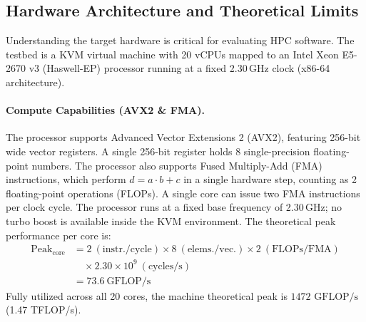 \documentclass[11pt,a4paper]{article}
\begin{document}
\subsection*{Hardware Architecture and Theoretical Limits}
Understanding the target hardware is critical for evaluating HPC software. The testbed is a KVM virtual machine with 20 vCPUs mapped to an Intel Xeon E5-2670 v3 (Haswell-EP) processor running at a fixed 2.30\,GHz clock (x86-64 architecture).

\paragraph{Compute Capabilities (AVX2 \& FMA).}
The processor supports Advanced Vector Extensions 2 (AVX2), featuring 256-bit wide vector registers. A single 256-bit register holds 8 single-precision floating-point numbers. The processor also supports Fused Multiply-Add (FMA) instructions, which perform $d = a \cdot b + c$ in a single hardware step, counting as 2 floating-point operations (FLOPs). 
A single core can issue two FMA instructions per clock cycle. The processor runs at a fixed base frequency of 2.30\,GHz; no turbo boost is available inside the KVM environment. The theoretical peak performance per core is:
\begin{equation}
\begin{split}
\text{Peak}_{\text{core}} &= 2\ (\text{instr./cycle}) \times 8\ (\text{elems./vec.}) \times 2\ (\text{FLOPs/FMA})\\
&\quad\times 2.30\times10^{9}\ (\text{cycles/s})\\
&= 73.6\ \text{GFLOP/s}
\end{split}
\end{equation}
Fully utilized across all 20 cores, the machine theoretical peak is $1472 \text{ GFLOP/s}$ (1.47 TFLOP/s).
\end{document}
